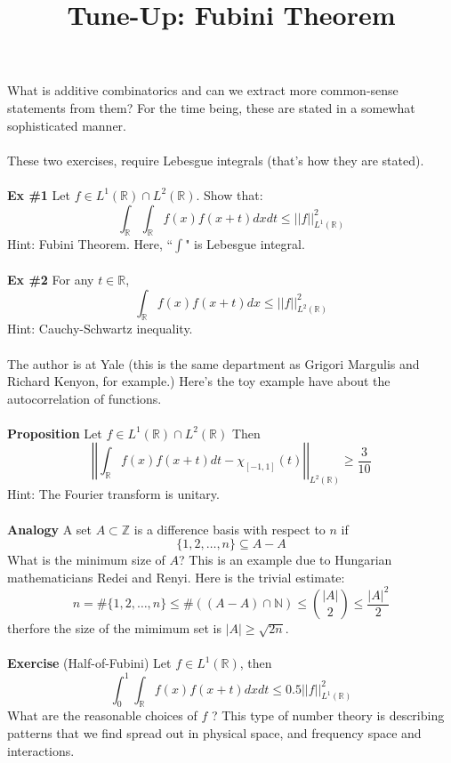 \documentclass[12pt]{article}
\title{Tune-Up: Fubini Theorem}
\date{}
\begin{document}
\sffamily

\maketitle

\noindent What is additive combinatorics and can we extract more common-sense statements from them?  For the time being, these are stated in a somewhat sophisticated manner.  \\ \\
These two exercises, require Lebesgue integrals (that's how they are stated).  \\ \\
\textbf{Ex \#1} Let $f \in L^1(\mathbb{R}) \cap L^2(\mathbb{R})$.  Show that:
$$ \int_\mathbb{R} \int_\mathbb{R} f(x) f(x+t) dx dt \leq || f||^2_{L^1(\mathbb{R})} $$
Hint: Fubini Theorem.  Here, ``$\int$" is Lebesgue integral. \\ \\
\textbf{Ex \#2} For any $t \in \mathbb{R}$, 
$$ \int_\mathbb{R} f(x) f(x+t) dx \leq || f||^2_{L^2(\mathbb{R})} $$
Hint: Cauchy-Schwartz inequality. \\ \\
The author is at Yale (this is the same department as Grigori Margulis and Richard Kenyon, for example.) Here's the toy example have about the autocorrelation of functions.  \\ \\
\textbf{Proposition} Let $f \in L^1(\mathbb{R}) \cap L^2(\mathbb{R}) $ Then
$$ \left|\left| \int_\mathbb{R} f(x) f(x+t) dt - \chi_{[-1,1]}(t) \right|\right|_{L^2(\mathbb{R})} \geq \frac{3}{10} $$
Hint: The Fourier transform is unitary. \\ \\
\textbf{Analogy} A set $A \subset \mathbb{Z}$ is a difference basis with respect to $n$ if 
$$ \{ 1, 2, \dots, n \} \subseteq A - A $$
What is the minimum size of $A$? This is an example due to Hungarian mathematicians Redei and Renyi.  Here is the trivial estimate:
$$ n = \# \{ 1, 2, \dots, n \} \leq \# ( (A-A) \cap \mathbb{N}  ) \leq \binom{|A|}{2} \leq \frac{|A|^2}{2} $$
therfore the size of the mimimum set is $|A| \geq \sqrt{2n} $. \\ \\
\textbf{Exercise} (Half-of-Fubini) Let $f \in L^1(\mathbb{R})$, then 
$$ \int_0^1 \int_\mathbb{R} f(x) f(x+t) dx dt \leq 0.5 ||f||^2_{L^1(\mathbb{R})} $$
What are the reasonable choices of $f$ ? This type of number theory is describing patterns that we find spread out in physical space, and frequency space and interactions.
\end{document}

